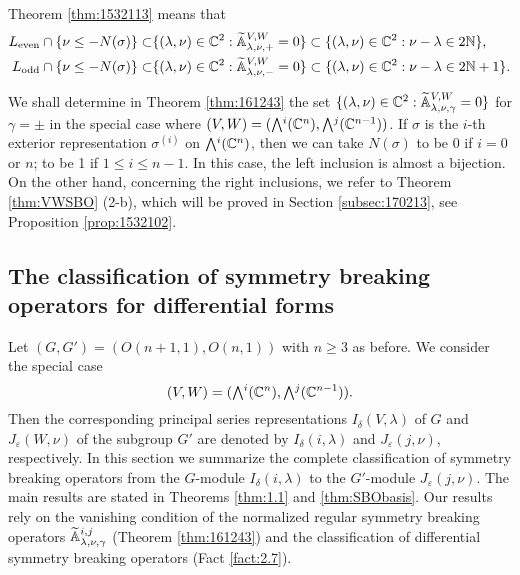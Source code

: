 Theorem \ref{thm:1532113} means that
\begin{align*}
L_{\operatorname{even}}
\cap 
\{\nu \le -N(\sigma) \}
\subset
&
\{(\lambda,\nu) \in {\mathbb{C}}^2
:
{\widetilde{\mathbb{A}}}_{{\lambda},{\nu},{+}}^{{V,W}} =0\}
\subset
\{(\lambda,\nu) \in {\mathbb{C}}^2
:
\nu-\lambda \in 2 {\mathbb{N}}\}, 
\\
L_{\operatorname{odd}}
\cap 
\{\nu \le -N(\sigma) \}
\subset
&
\{(\lambda,\nu) \in {\mathbb{C}}^2
:
{\widetilde{\mathbb{A}}}_{{\lambda},{\nu},{-}}^{{V,W}} =0\}
\subset
\{(\lambda,\nu) \in {\mathbb{C}}^2
:
\nu-\lambda \in 2 {\mathbb{N}}+1\}.  
\end{align*}


We shall determine in Theorem \ref{thm:161243}
 the set $\{(\lambda,\nu) \in {\mathbb{C}}^2:
{\widetilde{\mathbb{A}}}_{{\lambda},{\nu},{\gamma}}^{{V,W}} =0\}$
 for $\gamma = \pm$
 in the special case where $(V,W)=(\Exterior^i({\mathbb{C}}^n), \Exterior^j({\mathbb{C}}^{n-1}))$.  
If $\sigma$ is the $i$-th exterior representation $\sigma^{(i)}$
 on $\Exterior^i({\mathbb{C}}^n)$, 
 then we can take $N(\sigma)$ to be 0
 if $i=0$ or $n$;
 to be 1 if $1 \le i \le n-1$.  
In this case, 
 the left inclusion is almost a bijection.  
On the other hand, 
 concerning the right inclusions,
 we refer to Theorem \ref{thm:VWSBO} (2-b), 
 which will be proved
 in Section \ref{subsec:170213},
 see Proposition \ref{prop:1532102}.   



\subsection{The classification of symmetry breaking operators
 for differential forms}
\label{subsec:exhaust}

Let $(G,G')=(O(n+1,1),O(n,1))$ with $n \ge 3$
 as before.  
We consider the special case
\[
  (V,W)=(\Exterior^i({\mathbb{C}}^{n}), \Exterior^j({\mathbb{C}}^{n-1})).  
\]
Then the corresponding principal series representations
 $I_{\delta}(V,\lambda)$ of $G$
 and $J_{\varepsilon}(W,\nu)$ of the subgroup $G'$
 are denoted by $I_{\delta}(i,\lambda)$
 and $J_{\varepsilon}(j,\nu)$, 
 respectively.  
In this section 
 we summarize the complete classification
 of symmetry breaking operators from 
 the $G$-module $I_{\delta}(i,\lambda)$ 
 to the $G'$-module $J_{\varepsilon}(j,\nu)$.  
The main results are stated in Theorems \ref{thm:1.1} and \ref{thm:SBObasis}.  
Our results rely on the vanishing condition
 of the normalized regular symmetry breaking operators
 ${\widetilde{\mathbb{A}}}_{{\lambda},{\nu},{\gamma}}^{{i,j}}$
 (Theorem \ref{thm:161243}) 
 and the classification
 of differential symmetry breaking operators
 (Fact \ref{fact:2.7}).  



